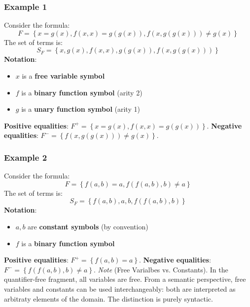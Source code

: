\documentclass[a4paper]{article}
\theoremstyle{definition}
\begin{document}
\subsubsection{Example 1}
Consider the formula:
\[
  F = \left\{ x = g(x), f(x,x) = g(g(x)), f(x,g(g(x))) \neq g(x) \right\}
\]
The set of terms is:
\[
  S_F = \left\{x,g(x), f(x,x), g(g(x)), f(x,g(g(x))) \right\}
\]
\textbf{Notation}:
\begin{itemize}
	\item \( x \) is a \textbf{free variable symbol}
	\item \( f \) is a \textbf{binary function symbol} (arity 2)
	\item \( g \) is a \textbf{unary function symbol} (arity 1)
\end{itemize}
\textbf{Positive equalities}: \( F^+ = \left\{ x = g(x), f(x,x) = g(g(x)) \right\} \).
\vspace{1em}
\noindent
\newline
\textbf{Negative equalities}: \( F^- = \left\{f(x,g(g(x))) \neq g(x) \right\} \).
\subsubsection{Example 2}
Consider the formula:
\[
	F = \left\{ f(a,b) = a, f(f(a,b),b) \neq a \right\}
\]
The set of terms is:
\[
  S_F = \left\{ f(a,b),a,b,f(f(a,b),b) \right\}
\]
\textbf{Notation}:
\begin{itemize}
	\item \( a,b \) are \textbf{constant symbols} (by convention)
	\item \( f \) is a \textbf{binary function symbol}
\end{itemize}
\textbf{Positive equalities}: \( F^+ = \left\{f(a,b) = a \right\} \).
\vspace{1em}
\noindent
\newline
\textbf{Negative equalities}: \( F^- = \left\{f(f(a,b),b) \neq a \right\} \).
\vspace{1em}
\noindent
\newline
\textit{Note} (Free Varialbes vs. Constants). In the quantifier-free fragment, all variables are free. From a semantic 
perspective, free variables and constants can be used interchangeably: both are interpreted as arbitraty elements of the 
domain. The distinction is purely syntactic.
\end{document}
